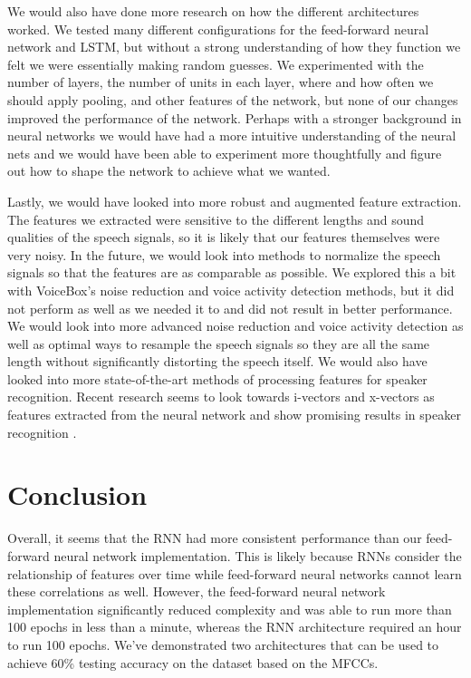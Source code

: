 \documentclass{article}
\begin{document}
We would also have done more research on how the different architectures worked.
We tested many different configurations for the feed-forward neural network and LSTM, but without a strong understanding of how they function we felt we were essentially making random guesses.
We experimented with the number of layers, the number of units in each layer, where and how often we should apply pooling, and other features of the network, but none of our changes improved the performance of the network.
Perhaps with a stronger background in neural networks we would have had a more intuitive understanding of the neural nets and we would have been able to experiment more thoughtfully and figure out how to shape the network to achieve what we wanted.

Lastly, we would have looked into more robust and augmented feature extraction.
The features we extracted were sensitive to the different lengths and sound qualities of the speech signals, so it is likely that our features themselves were very noisy.
In the future, we would look into methods to normalize the speech signals so that the features are as comparable as possible.
We explored this a bit with VoiceBox’s noise reduction and voice activity detection methods, but it did not perform as well as we needed it to and did not result in better performance.
We would look into more advanced noise reduction and voice activity detection as well as optimal ways to resample the speech signals so they are all the same length without significantly distorting the speech itself.
We would also have looked into more state-of-the-art methods of processing features for speaker recognition.
Recent research seems to look towards i-vectors and x-vectors as features extracted from the neural network and show promising results in speaker recognition \cite{ivector, xvector}.


\section{Conclusion}
\label{sec:conclusion}

Overall, it seems that the RNN had more consistent performance than our feed-forward neural network implementation.
This is likely because RNNs consider the relationship of features over time while feed-forward neural networks cannot learn these correlations as well.
However, the feed-forward neural network implementation significantly reduced complexity and was able to run more than 100 epochs in less than a minute, whereas the RNN architecture required an hour to run 100 epochs.
We’ve demonstrated two architectures that can be used to achieve 60\% testing accuracy on the dataset based on the MFCCs.



\end{document}
